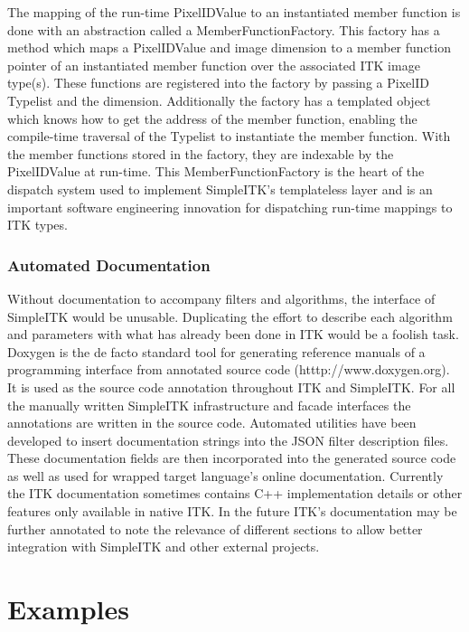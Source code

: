 \documentclass{frontiersMED} %
\begin{document}
The mapping of the run-time PixelIDValue to an instantiated member
function is done with an abstraction called a
MemberFunctionFactory. This factory has a method which maps a
PixelIDValue and image dimension to a member function pointer of an
instantiated member function over the associated ITK image
type(s). These functions are registered into the factory by passing a
PixelID Typelist and the dimension. Additionally the factory has a
templated object which knows how to get the address of  the member
function, enabling the compile-time traversal of the Typelist to
instantiate the member function.  With the member functions stored in
the factory, they are indexable by the PixelIDValue at run-time. This
MemberFunctionFactory is the heart of the dispatch system used to
implement SimpleITK’s templateless layer and is an important software
engineering innovation for dispatching run-time mappings to ITK types.

\subsubsection{Automated Documentation}
Without documentation to accompany filters and algorithms, the
interface of SimpleITK would be unusable. Duplicating the effort to
describe each algorithm and parameters with what has already been done
in ITK would be a foolish task. Doxygen is the de facto standard tool
for generating reference manuals of a programming interface from
annotated source code (htttp://www.doxygen.org). It is used as the source code annotation
throughout ITK and SimpleITK. For all the manually written SimpleITK
infrastructure and facade interfaces the annotations are written in
the source code. Automated utilities have been developed to insert
documentation strings into the JSON filter description files. These
documentation fields are then incorporated into the generated source
code as well as used for wrapped target language’s online
documentation. Currently the ITK documentation sometimes contains C++
implementation details or other features only available in native ITK.
In the future ITK’s documentation may be further annotated to
note the relevance of different sections to allow better
integration with SimpleITK and other external projects.



\section{Examples}
\end{document}
